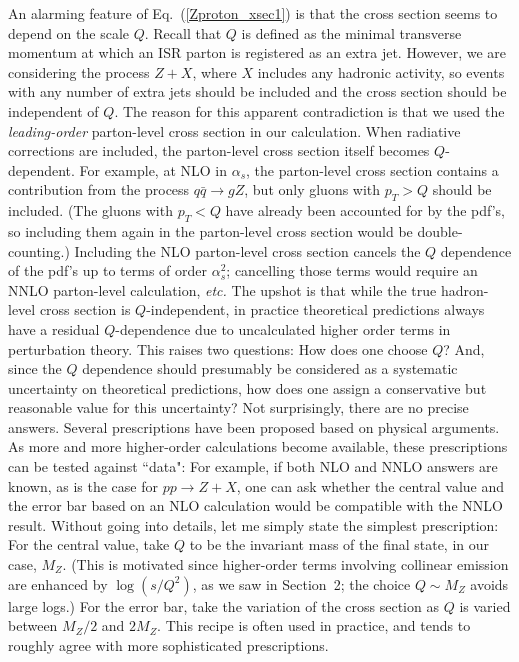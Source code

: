 \documentclass{ws-procs9x6}
\def\leqn#1{(\ref{#1})}
\begin{document}
An alarming feature of Eq.~\leqn{Zproton_xsec1} is that the cross section seems to depend on the scale $Q$. Recall that $Q$ is defined as the minimal transverse momentum at which an ISR parton is registered as an extra jet. However, we are considering the process $Z+X$, where $X$ includes any hadronic activity, so events with any number of extra jets should be included and the cross section should be independent of $Q$. The reason for this apparent contradiction is that we used the {\it leading-order} parton-level cross section in our calculation. When radiative corrections are included, the parton-level cross section itself becomes $Q$-dependent. For example, at NLO in $\alpha_s$, the parton-level cross section contains a contribution from the process $q\bar{q}\to gZ$, but only gluons with $p_T>Q$ should be included. (The gluons with $p_T<Q$ have already been accounted for by the pdf's, so including them again in the parton-level cross section would be double-counting.) Including the NLO parton-level cross section cancels the $Q$ dependence of the pdf's up to terms of order $\alpha_s^2$; cancelling those terms would require an NNLO parton-level calculation, {\it etc.} The upshot is that while the true hadron-level cross section is $Q$-independent, in practice theoretical predictions always have a residual $Q$-dependence due to uncalculated higher order terms in perturbation theory. This raises two questions: How does one choose $Q$? And, since the $Q$ dependence should presumably be considered as a systematic uncertainty on theoretical predictions, how does one assign a conservative but reasonable value for this uncertainty? Not surprisingly, there are no precise answers. Several prescriptions have been proposed based on physical arguments. As more and more higher-order calculations become available, these prescriptions can be tested against ``data": For example, if both NLO and NNLO answers are known, as is the case for $pp\to Z+X$, one can ask whether the central value and the error bar based on an NLO calculation would be compatible with the NNLO result. Without going into details, let me simply state the simplest prescription: For the central value, take $Q$ to be the invariant mass of the final state, in our case, $M_Z$. (This is motivated since higher-order terms involving collinear emission are enhanced by $\log (s/Q^2)$, as we saw in Section~2; the choice $Q\sim M_Z$ avoids large logs.) For the error bar, take the variation of the cross section as $Q$ is varied between $M_Z/2$ and $2M_Z$. This recipe is often used in practice, and tends to roughly agree with more sophisticated prescriptions. 
\end{document}
